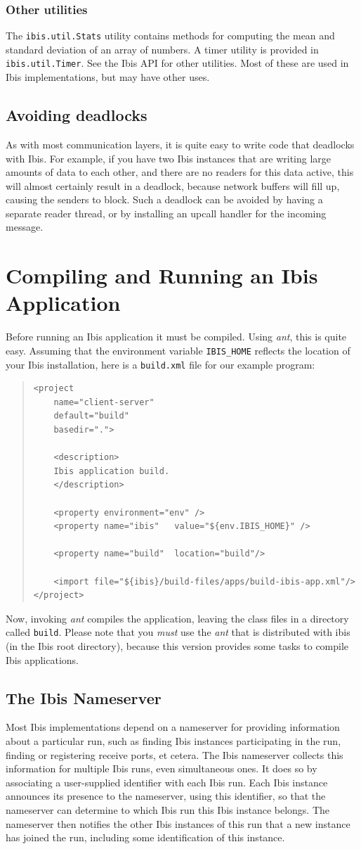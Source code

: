 \documentclass[10pt]{article}
\newcommand{\mysection}[1]{\section{#1}\label{#1}}
\newcommand{\mysubsection}[1]{\subsection{#1}\label{#1}}
\newcommand{\mysubsubsection}[1]{\subsubsection{#1}\label{#1}}
\begin{document}
\mysubsubsection{Other utilities}

The \texttt{ibis.util.Stats} utility contains methods for computing
the mean and standard deviation of an array of numbers.
A timer utility is provided in \texttt{ibis.util.Timer}.
See the Ibis API for other utilities. Most of these are used in
Ibis implementations, but may have other uses.

\mysubsection{Avoiding deadlocks}

As with most communication layers, it is quite easy to write code that
deadlocks with Ibis. For example, if you have two Ibis instances that
are writing large amounts of data to each other, and there are no
readers for this data active, this will almost certainly result in a deadlock,
because network buffers will fill up, causing the senders to block.
Such a deadlock can be avoided by having a separate reader thread,
or by installing an upcall handler for the incoming message.

\mysection{Compiling and Running an Ibis Application}

Before running an Ibis application it must be compiled.  Using
\emph{ant}, this is quite easy. Assuming that the environment variable
\texttt{IBIS\_HOME} reflects the location of your Ibis installation,
here is a \texttt{build.xml} file
for our example program:

\begin{quote}
\begin{verbatim}
<project
    name="client-server"
    default="build"
    basedir=".">

    <description>
    Ibis application build.
    </description>

    <property environment="env" />
    <property name="ibis"   value="${env.IBIS_HOME}" />

    <property name="build"  location="build"/>

    <import file="${ibis}/build-files/apps/build-ibis-app.xml"/>
</project>
\end{verbatim}
\end{quote}

Now, invoking \emph{ant} compiles the application, leaving the class files
in a directory called \texttt{build}.
Please note that you \emph{must} use the \emph{ant} that is
distributed with ibis (in the Ibis root directory), because this
version provides some tasks to compile Ibis applications.

\mysubsection{The Ibis Nameserver}

Most Ibis implementations depend on a nameserver for providing
information about a particular run, such as finding Ibis instances
participating in the run, finding or registering receive ports, et cetera.
The Ibis nameserver collects this information for multiple Ibis
runs, even simultaneous ones. It does so by associating a user-supplied
identifier with each Ibis run. Each Ibis instance announces its
presence to the nameserver, using this identifier, so that the
nameserver can determine to which Ibis run this Ibis instance belongs.
The nameserver then notifies the other Ibis instances of this run that
a new instance has joined the run, including some identification of
this instance.
\end{document}
